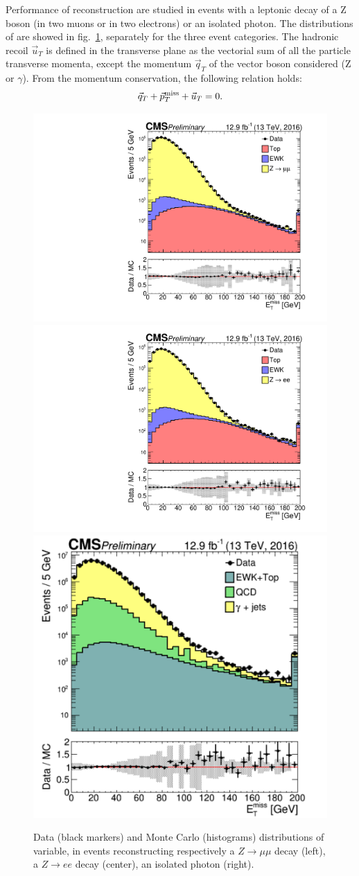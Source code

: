 \noindent Performance of \MET reconstruction are studied in events with a leptonic decay of a Z boson (in two muons or in two electrons) or an isolated photon. The distributions of \MET are showed in fig.~\ref{fig:recoil_distribution}, separately for the three event categories. The hadronic recoil $\vec{u}_T$ is defined in the transverse plane as the vectorial sum of all the particle transverse momenta, except the momentum $\vec{q}_T$ of the vector boson considered (Z or $\gamma$). From the momentum conservation, the following relation holds:
\begin{equation}
\vec{q}_T + \vec{p}_T^{\text{miss}} + \vec{u}_T = 0.
\label{eq:recoil_def}
\end{equation}

\begin{figure}[!htb]
  \centering
    \includegraphics[width=.33\textwidth]{figures/MetPlots/distr_mu.pdf}%
    \includegraphics[width=.33\textwidth]{figures/MetPlots/distr_ele.pdf}%
    \includegraphics[width=.33\textwidth]{figures/MetPlots/distr_gamma.pdf}


  \caption{Data (black markers) and Monte Carlo (histograms) distributions of \MET variable, in events reconstructing respectively a $Z \rightarrow \mu \mu$ decay (left), a $Z \rightarrow e e$ decay (center), an isolated photon (right).}
  \label{fig:recoil_distribution}
\end{figure}

